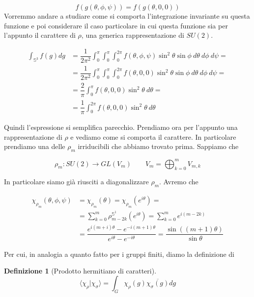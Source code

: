 \documentclass[11pt]{article}
\theoremstyle{plain}
\theoremstyle{definition}
\newtheorem{defn}{Definizione}[section]
\theoremstyle{remark}
\newcommand{\dsum}{\displaystyle\sum}
\newcommand{\dint}{\displaystyle\int}
\begin{document}
 \[ f(g(\theta, \phi, \psi)) = f(g(\theta, 0 , 0)) \]
 Vorremmo andare a studiare come si comporta l'integrazione invariante su questa funzione e poi considerare il caso particolare in cui questa funzione sia per l'appunto il carattere di $\rho$, una generica rappresentazione di $SU(2)$.

 \begin{align*}
 \dint_{\mathbb{S}^3} f(g) dg &= \dfrac{1}{2\pi^2} \dint_0^\pi \dint_0^{\pi} \dint_0 ^{2\pi} f(\theta, \phi, \psi) \sin^2\theta\sin\phi \ d\theta \ d\phi \ d\psi = \\
 &=\dfrac{1}{2\pi^2} \dint_0^\pi \dint_0^{\pi} \dint_0 ^{2\pi} f(\theta, 0, 0) \sin^2\theta\sin\phi \ d\theta \ d\phi \ d\psi = \\
 &= \dfrac{2}{\pi} \dint_0^\pi f(\theta, 0, 0) \sin^2\theta \ d\theta = \\
  &= \dfrac{1}{\pi} \dint_0^{2\pi} f(\theta, 0, 0) \sin^2\theta \ d\theta 
 \end{align*}
 
 Quindi l'espressione si semplifica parecchio. Prendiamo ora per l'appunto una rappresentazione di $\rho$ e vediamo come si comporta il carattere. In particolare prendiamo una delle $\rho_m$ irriducibili che abbiamo trovato prima. Sappiamo che

 \[ \rho_m: SU(2) \to GL(V_m) \qquad V_m = \bigoplus_{k=0}^m V_{m,k}\]
 
 In particolare siamo già riusciti a diagonalizzare $\rho_m$. Avremo che

 \begin{align*}
   \chi_{\rho_m} (\theta, \phi, \psi) &= \chi_{\rho_m}(\theta) = \chi_{\rho_m}(e^{i\theta}) = \\
   &= \dsum_{k=0}^m \rho_{m-2k}^{\mathbb{S}^1}(e^{i\theta}) = \dsum_{k=0}^m e^{i(m-2k)} \\
   &= \dfrac{e^{i(m+i)\theta} - e^{-i(m+1)\theta}}{e^{i\theta} - e^{-i\theta}} = \dfrac{\sin((m+1)\theta)}{\sin\theta}
 \end{align*} 
 


 Per cui, in analogia a quanto fatto per i gruppi finiti, diamo la definizione di

 \begin{defn}[Prodotto hermitiano di caratteri]

   \[
   \langle \chi_\rho | \chi_\sigma \rangle = \dint_G \chi_\rho(g) \overline{\chi_\sigma(g)} dg
   \]

 \end{defn}
\end{document}
